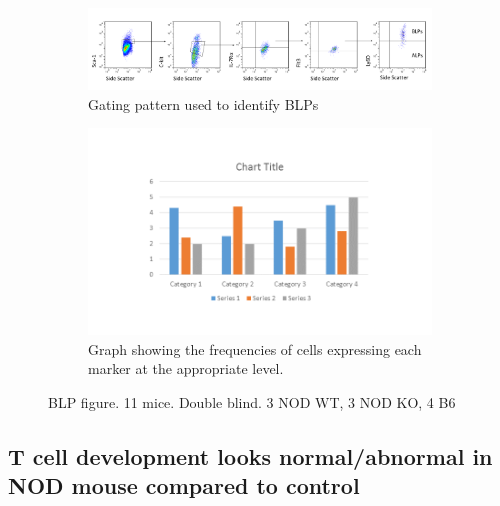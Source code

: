 \begin{figure}
	\begin{subfigure}{\textwidth}
	\includegraphics[width=\textwidth]{Figures/BLPgating.png}
	\caption{Gating pattern used to identify BLPs}
	\label{subfig:BLPgating}
	\end{subfigure}
	\begin{subfigure}{\textwidth}
	\includegraphics[width=\textwidth]{Figures/BLPgraph.png}
	\caption{Graph showing the frequencies of cells expressing each marker at the appropriate level.}
	\label{subfig:BLPgraph}
	\end{subfigure}
\caption{BLP figure. 11 mice. Double blind. 3 NOD WT, 3 NOD KO, 4 B6}
\label{fig:BLPs}
\end{figure}





\subsection{T cell development looks normal/abnormal in NOD mouse compared to control}


